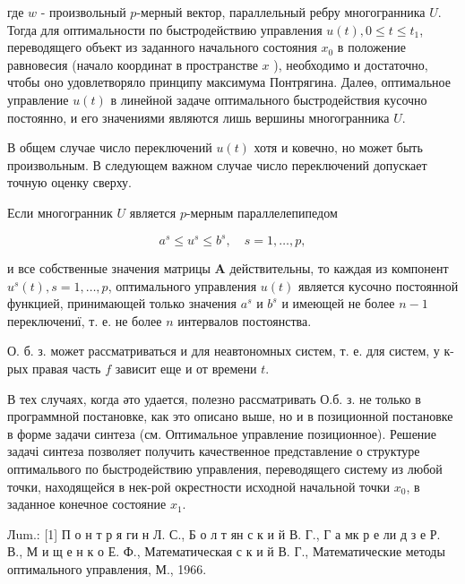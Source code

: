 \documentclass[10pt]{article}
\begin{document}
где $w$ - произвольный $p$-мерный вектор, параллельный ребру многогранника $U$. Тогда для оптимальности по быстродействию управления $u(t), 0 \leqslant t \leqslant t_{1}$, переводящего объект из заданного начального состояния $x_{0}$ в положение равновесия (начало координат в пространстве $x$ ), необходимо и достаточно, чтобы оно удовлетворяло принципу максимума Понтрягина. Далеө, оптимальное управление $u(t)$ в линейной задаче оптимального быстродействия кусочно постоянно, и его значениями являются лишь вершины многогранника $U$.



В общем случае число переключений $u(t)$ хотя и ковечно, но может быть произвольным. В следующем важном случае число переключений допускает точную оценку сверху.



Если многогранник $U$ является $p$-мерным параллелепипедом



\[

a^{s} \leqslant u^{s} \leqslant b^{s}, \quad s=1, \ldots, p,

\]



и все собственные значения матрицы $\boldsymbol{A}$ действительны, то каждая из компонент $u^{s}(t), s=1, \ldots, p$, оптимального управления $u(t)$ является кусочно постоянной функцией, принимающей только значения $a^{s}$ и $b^{s}$ и имеющей не более $n-1$ переключениї, т. е. не более $n$ интервалов постоянства.



О. б. з. может рассматриваться и для неавтономных систем, т. е. для систем, у к-рых правая часть $f$ зависит еще и от времени $t$.



В тех случаях, когда әто удается, полезно рассматривать О.б. з. не только в программной постановке, как это описано выше, но и в позиционной постановке в форме задачи синтеза (см. Оптимальное управление позиционное). Решение задачі синтеза позволяет получить качественное представление о структуре оптимальвого по быстродействию управления, переводящего систему из любой точки, находящейся в нек-рой окрестности исходной начальной точки $x_{0}$, в заданное конечное состояние $x_{1}$.



Лum.: [1] П о н т р я ги н Л. С., Б о л т ян с к и й В. Г., Г а мк р е ли д з е Р. В., М и щ е н к о Е. Ф., Математическая с к и й В. Г., Математические методы оптимального управления, М., 1966.
\end{document}
